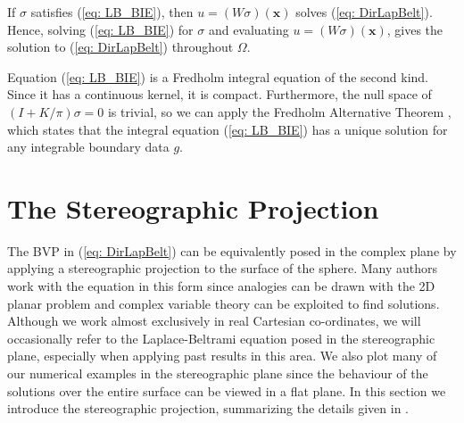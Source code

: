 \documentclass{sfuthesis}
\begin{document}
If $\sigma$ satisfies (\ref{eq: LB_BIE}), then $u=(W\sigma)(\mathbf{x})$ solves (\ref{eq: DirLapBelt}). Hence, solving  (\ref{eq: LB_BIE}) for $\sigma$ and evaluating $u=(W\sigma)(\mathbf{x})$, gives the solution to (\ref{eq: DirLapBelt}) throughout $\Omega$. 

Equation (\ref{eq: LB_BIE}) is a Fredholm integral equation of the second kind. Since it has a continuous kernel, it is compact.  Furthermore, the null space of $(I+K/ \pi) \sigma=0$ is trivial, so we can apply the Fredholm Alternative Theorem \cite{Atk97}, which states that the integral equation (\ref{eq: LB_BIE}) has a unique solution for any integrable boundary data $g$. 

\section{The Stereographic Projection}
\label{sec: StereographicProjection}
The BVP in (\ref{eq: DirLapBelt}) can be equivalently posed in the complex plane by applying a stereographic projection to the surface of the sphere. Many authors \cite{KropNig2014, Crowdy2006, Kid2000, Kid2000Stream, Newt2001} work with the equation in this form since analogies can be drawn with the 2D planar problem and complex variable theory can be exploited to find solutions. Although we work almost exclusively in real Cartesian co-ordinates, we will occasionally refer to the Laplace-Beltrami equation posed in the stereographic plane, especially when applying past results in this area. We also plot many of our numerical examples in the stereographic plane since the behaviour of the solutions over the entire surface can be viewed in a flat plane. In this section we introduce the stereographic projection, summarizing the details given in \cite{KropNig2014, Crowdy2006}. 
\end{document}
